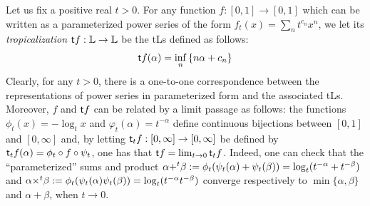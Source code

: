 Let us fix a positive real $t>0$. For any function $f:[0,1]\to [0,1]$ which can be written as a parameterized {power series} of the form $f_{t}(x)= \sum_{n}t^{c_{n}}x^{n}$, 
  we let its \emph{tropicalization} $\mathsf{t} f: \mathbb{L} \to \mathbb{L}$ be the tLs defined as follows:
\begin{align}\label{eq:defTLS}
\trop f(\alpha) =\inf_{n}\left\{ n\alpha+c_{n}\right\}
\end{align}
Clearly, for any $t>0$, there is a one-to-one correspondence between the representations of power series in parameterized form and the associated tLs. Moreover, 
$f$ and $\mathsf{t} f$ can be related by a limit passage as follows: the functions $\phi_{t}(x)= -\log_{t}x$ and $\varphi_{t}(\alpha)= t^{-\alpha}$ define continuous bijections between $[0,1]$ and $[0,\infty]$ and, by letting
$\mathsf{t} _{t}f: [0,\infty]\to [0,\infty]$ be defined by 
$\mathsf{t} _{t}f(\alpha)= \phi_{t}\circ f \circ \psi_{t}$, one has that 
$\mathsf{t} f= \lim_{t\to 0}\mathsf{t} _{t}f$. 
Indeed, one can check that the ``parameterized'' sums and product $\alpha {+}^{t}\beta:= \phi_{t}(\psi_{t}(\alpha)+\psi_{t}(\beta))= \log_{t}(t^{-\alpha}+t^{-\beta})$ and 
$\alpha {\times}^{t}\beta:= \phi_{t}( \psi_{t}(\alpha)\psi_{t}(\beta))=
\log_{t}(t^{-\alpha}t^{-\beta})$ converge respectively to $\min\{\alpha,\beta\}$ and $\alpha+\beta$, when $t\to 0$.

